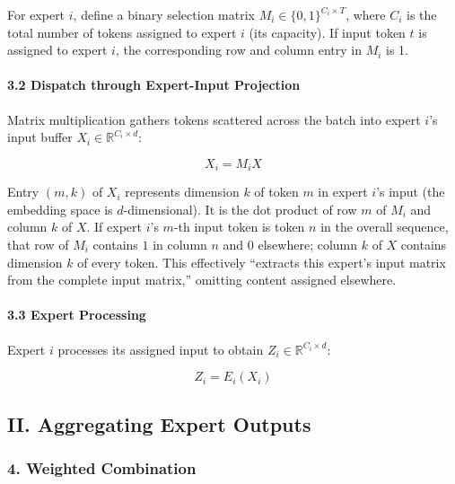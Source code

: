 For expert \(i\), define a binary selection matrix \(M_i \in \{0,1\}^{C_i \times T}\), where \(C_i\) is the total number of tokens assigned to expert \(i\) (its capacity). If input token \(t\) is assigned to expert \(i\), the corresponding row and column entry in \(M_i\) is 1.

\hypertarget{dispatch-through-expert-input-projection}{%
\paragraph{3.2 Dispatch through Expert-Input Projection}\label{dispatch-through-expert-input-projection}}

Matrix multiplication gathers tokens scattered across the batch into expert \(i\)'s input buffer \(X_i \in \mathbb{R}^{C_i \times d}\):

\[
X_i = M_iX
\]

Entry \((m,k)\) of \(X_i\) represents dimension \(k\) of token \(m\) in expert \(i\)'s input (the embedding space is \(d\)-dimensional). It is the dot product of row \(m\) of \(M_i\) and column \(k\) of \(X\). If expert \(i\)'s \(m\)-th input token is token \(n\) in the overall sequence, that row of \(M_i\) contains \(1\) in column \(n\) and \(0\) elsewhere; column \(k\) of \(X\) contains dimension \(k\) of every token. This effectively ``extracts this expert's input matrix from the complete input matrix,'' omitting content assigned elsewhere.

\hypertarget{expert-processing}{%
\paragraph{3.3 Expert Processing}\label{expert-processing}}

Expert \(i\) processes its assigned input to obtain \(Z_i \in \mathbb{R}^{C_i \times d}\):

\[
Z_i = E_i(X_i)
\]

\hypertarget{ii.-aggregating-expert-outputs}{%
\subsection{II. Aggregating Expert Outputs}\label{ii.-aggregating-expert-outputs}}

\hypertarget{weighted-combination}{%
\subsubsection{4. Weighted Combination}\label{weighted-combination}}

